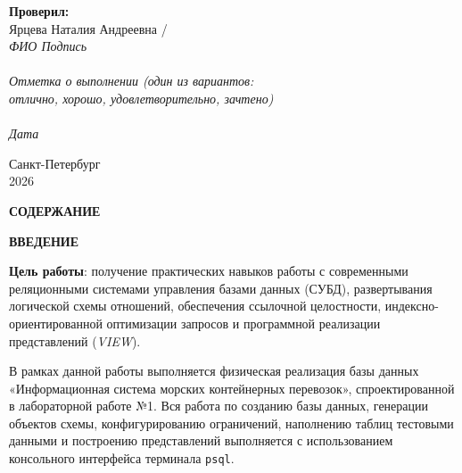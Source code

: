 \documentclass[a4paper,14pt]{article}
\begin{document}
\begin{titlepage}
\begin{flushright}
        \textbf{Проверил:}\\ [0.5em]
        Ярцева Наталия Андреевна / \underline{\hspace{1.5cm}} \\
        {\scriptsize{\textit{ФИО \hspace{2cm} Подпись \hspace{1cm}}}} \\ [1.5cm]

        {\scriptsize \underline{\hspace{4cm}}} \\
        {\scriptsize \textit{Отметка о выполнении (один из вариантов: \\ отлично, хорошо, удовлетворительно, зачтено)}} \\
        {\scriptsize \underline{\hspace{4cm}}} \\
        {\scriptsize \textit{Дата \hspace{1.5cm}}}
    \end{flushright}

    \vfill
    Санкт-Петербург\\
    2026
\end{titlepage}

\newpage
\pagestyle{plain}
\setcounter{page}{2}

\begin{center}
    {\bfseries \MakeUppercase{Содержание}}
\end{center}
\vspace{-0.5cm}
\tableofcontents

\newpage
\begin{center}
    {\bfseries \MakeUppercase{Введение}}
\end{center}

\textbf{Цель работы}: получение практических навыков работы с современными реляционными системами управления базами данных (СУБД), развертывания логической схемы отношений, обеспечения ссылочной целостности, индексно-ориентированной оптимизации запросов и программной реализации представлений (\textit{VIEW}).

В рамках данной работы выполняется физическая реализация базы данных «Информационная система морских контейнерных перевозок», спроектированной в лабораторной работе №1. Вся работа по созданию базы данных, генерации объектов схемы, конфигурированию ограничений, наполнению таблиц тестовыми данными и построению представлений выполняется с использованием консольного интерфейса терминала \texttt{psql}.
\end{document}
